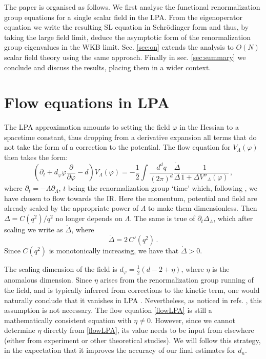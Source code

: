 \documentclass[11pt,a4paper]{article}
\numberwithin{figure}{section}
\numberwithin{equation}{section}
\newcommand{\be}{\begin{equation}}
\newcommand{\ee}{\end{equation}}
\newcommand{\ph}{\varphi}
\begin{document}
The paper is organised as follows. We first analyse the functional renormalization group equations for a single scalar field in the LPA. From the eigenoperator equation we write the resulting SL equation in Schr\"odinger form and thus, by taking the large field limit, deduce the asymptotic form of the renormalization group eigenvalues in the WKB limit. Sec. \ref{sec:on} extends the analysis to $O(N)$ scalar field theory using the same approach. Finally in sec. \ref{sec:summary} we conclude and discuss the results, placing them in a wider context.




\section{Flow equations in LPA}
The LPA approximation amounts to setting the field $\ph$ in the Hessian to a spacetime constant, thus dropping from a derivative expansion all terms that do not take the form of a correction to the potential. The flow equation for $V_\Lambda(\ph)$ then takes the form:
\begin{equation}
    \left( \partial_t + d_\varphi \varphi \frac{\partial}{\partial \varphi}-d \right) V_\Lambda(\varphi)=-\frac12\int \frac{d^d q}{(2\pi)^d}\frac{\dot{\Delta}}{\Delta}\frac{1}{1+\Delta V''_\Lambda(\varphi)}\,, \label{flowLPA}
\end{equation}
where $\partial_t=-\Lambda\partial_\Lambda$, $t$ being the renormalization group `time' which, following \cite{Wilson:1973}, we have chosen to flow towards the IR. Here the momentum, potential and field are already scaled by the appropriate power of $\Lambda$ to make them dimensionless. Then $\Delta = C(q^2)/q^2$ no longer depends on $\Lambda$. The same is true of $\partial_t \Delta_\Lambda$, which after scaling we write as $\dot{\Delta}$, where
\be 
\dot{\Delta} =  2\, C'(q^2)\,.
\ee
Since $C(q^2)$ is monotonically increasing, we have that $\dot{\Delta}>0$. 

The scaling dimension of the field is $d_\varphi=\frac{1}{2}(d-2+\eta)$, where $\eta$ is the anomalous dimension. Since $\eta$ arises from the renormalization group running of the field, and is typically inferred from corrections to the kinetic term, one would naturally conclude that it vanishes in LPA \cite{Wilson:1973,Nicoll:1974zz,Hasenfratz:1985dm,Felder:1987,Ball:1994ji,Morris:1994ki,Morris:1995af,Aoki:1996fn,Comellas:1997tf,Bagnuls:2000}. Nevertheless, as noticed in refs. \cite{Osborn:2009vs,Bervillier:2013hha}, this assumption is not necessary. The flow equation \eqref{flowLPA} is still a mathematically consistent equation with $\eta\ne0$. However, since we cannot determine $\eta$ directly from \eqref{flowLPA}, its value needs to be input from elsewhere (either from experiment or other theoretical studies). We will follow this strategy, in the expectation that it improves the accuracy of our final estimates for $d_n$.
\end{document}
